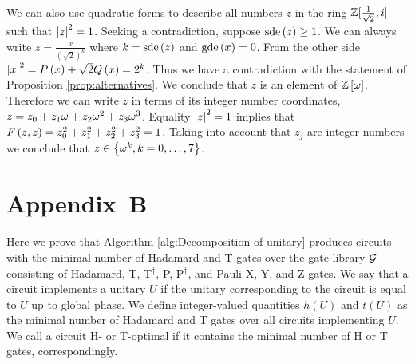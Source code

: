 \documentclass[english,journal]{extarticle}
\theoremstyle{plain}
\theoremstyle{plain}
\theoremstyle{plain}
\theoremstyle{definition}
\theoremstyle{plain}
\theoremstyle{plain}
\begin{document}
We can also use quadratic forms to describe all numbers $z$ in the ring
$\mathbb{Z}[\frac{1}{\sqrt{2}},i]$ such that $\left|z\right|^{2}=1$. Seeking a contradiction, suppose
$\mathrm{sde}\left(z\right)\ge 1$.
We can always write $z=\frac{x}{\left(\sqrt{2}\right)^{k}}$ where
$k=\mathrm{sde}\left(z\right)$ and $\mathbf{\mathrm{gde}}\left(x\right)=0$. From the other
side $\left|x\right|^{2}=P\left(x\right)+\sqrt{2}Q\left(x\right)=2^{k}$.
Thus we have a contradiction with the statement of Proposition \ref{prop:alternatives}.
We conclude that $z$ is an element of $\mathbb{Z}\left[\omega\right]$. Therefore we can
write $z$ in terms of its integer number coordinates, 
$z=z_{0}+z_{1}\omega+z_{2}\omega^{2}+z_{3}\omega^{3}$.
Equality $\left|z\right|^{2}=1$ implies that $F\left( z,z\right)=z_{0}^{2}+z_{1}^{2}+z_{2}^{2}+z_{3}^{2}=1$.
Taking into account that $z_{j}$ are integer numbers we conclude that $z\in\left\{
\omega^{k},k=0,\ldots,7\right\} $.

\section*{Appendix~B}
\label{app:B}

Here we prove that Algorithm \ref{alg:Decomposition-of-unitary} produces circuits with the minimal number
of Hadamard and T gates over the gate library $\mathcal{G}$ consisting of Hadamard, T, T${}^{\dagger}$,
P, P${}^{\dagger}$, and Pauli-X, Y, and Z gates.  We say that a circuit implements a unitary $U$ if the unitary corresponding 
to the circuit is equal to $U$ up to global phase.  We define integer-valued quantities $h(U)$ and $t(U)$ as 
the minimal number of Hadamard and T gates over all circuits implementing $U$.  We call a circuit 
H- or T-optimal if it contains the minimal number of H or T gates, correspondingly. 
\end{document}
